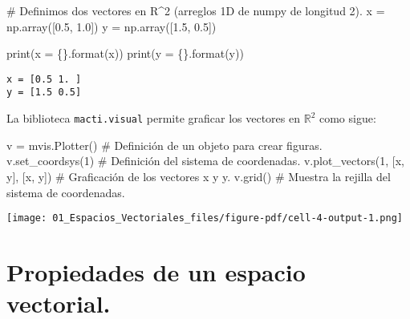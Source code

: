 \documentclass[
  letterpaper,
  DIV=11,
  numbers=noendperiod]{scrreprt}
\newenvironment{Shaded}{\begin{snugshade}}{\end{snugshade}}
\newcommand{\BuiltInTok}[1]{\textcolor[rgb]{0.00,0.23,0.31}{#1}}
\newcommand{\CommentTok}[1]{\textcolor[rgb]{0.37,0.37,0.37}{#1}}
\newcommand{\DecValTok}[1]{\textcolor[rgb]{0.68,0.00,0.00}{#1}}
\newcommand{\FloatTok}[1]{\textcolor[rgb]{0.68,0.00,0.00}{#1}}
\newcommand{\NormalTok}[1]{\textcolor[rgb]{0.00,0.23,0.31}{#1}}
\newcommand{\OperatorTok}[1]{\textcolor[rgb]{0.37,0.37,0.37}{#1}}
\newcommand{\SpecialCharTok}[1]{\textcolor[rgb]{0.37,0.37,0.37}{#1}}
\newcommand{\StringTok}[1]{\textcolor[rgb]{0.13,0.47,0.30}{#1}}
\begin{document}
\begin{Shaded}
\begin{Highlighting}[]
\CommentTok{\# Definimos dos vectores en R\^{}2 (arreglos 1D de numpy de longitud 2).}
\NormalTok{x }\OperatorTok{=}\NormalTok{ np.array([}\FloatTok{0.5}\NormalTok{, }\FloatTok{1.0}\NormalTok{])}
\NormalTok{y }\OperatorTok{=}\NormalTok{ np.array([}\FloatTok{1.5}\NormalTok{, }\FloatTok{0.5}\NormalTok{])}

\BuiltInTok{print}\NormalTok{(}\StringTok{\textquotesingle{}x = }\SpecialCharTok{\{\}}\StringTok{\textquotesingle{}}\NormalTok{.}\BuiltInTok{format}\NormalTok{(x))}
\BuiltInTok{print}\NormalTok{(}\StringTok{\textquotesingle{}y = }\SpecialCharTok{\{\}}\StringTok{\textquotesingle{}}\NormalTok{.}\BuiltInTok{format}\NormalTok{(y))}
\end{Highlighting}
\end{Shaded}

\begin{verbatim}
x = [0.5 1. ]
y = [1.5 0.5]
\end{verbatim}

La biblioteca \texttt{macti.visual} permite graficar los vectores en
\(\mathbb{R}^2\) como sigue:

\begin{Shaded}
\begin{Highlighting}[]
\NormalTok{v }\OperatorTok{=}\NormalTok{ mvis.Plotter()  }\CommentTok{\# Definición de un objeto para crear figuras.}
\NormalTok{v.set\_coordsys(}\DecValTok{1}\NormalTok{)   }\CommentTok{\# Definición del sistema de coordenadas.}
\NormalTok{v.plot\_vectors(}\DecValTok{1}\NormalTok{, [x, y], [}\StringTok{\textquotesingle{}x\textquotesingle{}}\NormalTok{, }\StringTok{\textquotesingle{}y\textquotesingle{}}\NormalTok{]) }\CommentTok{\# Graficación de los vectores \textquotesingle{}x\textquotesingle{} y \textquotesingle{}y\textquotesingle{}.}
\NormalTok{v.grid()  }\CommentTok{\# Muestra la rejilla del sistema de coordenadas.}
\end{Highlighting}
\end{Shaded}

\texttt{[image: 01\_Espacios\_Vectoriales\_files/figure-pdf/cell-4-output-1.png]}

\section{Propiedades de un espacio
vectorial.}\label{propiedades-de-un-espacio-vectorial.}
\end{document}
